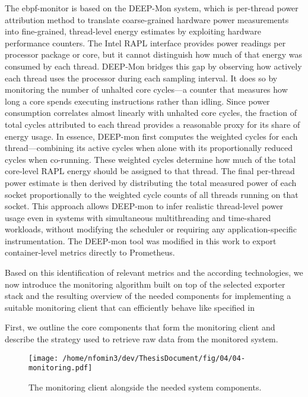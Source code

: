 The ebpf-monitor is based on the DEEP-Mon system, which is per-thread power attribution method to translate coarse-grained hardware power measurements into fine-grained, thread-level energy estimates by exploiting hardware performance counters. The Intel RAPL interface provides power readings per processor package or core, but it cannot distinguish how much of that energy was consumed by each thread. DEEP-Mon bridges this gap by observing how actively each thread uses the processor during each sampling interval. It does so by monitoring the number of unhalted core cycles—a counter that measures how long a core spends executing instructions rather than idling. Since power consumption correlates almost linearly with unhalted core cycles, the fraction of total cycles attributed to each thread provides a reasonable proxy for its share of energy usage.
In essence, DEEP-mon first computes the weighted cycles for each thread—combining its active cycles when alone with its proportionally reduced cycles when co-running. These weighted cycles determine how much of the total core-level RAPL energy should be assigned to that thread. The final per-thread power estimate is then derived by distributing the total measured power of each socket proportionally to the weighted cycle counts of all threads running on that socket. This approach allows DEEP-mon to infer realistic thread-level power usage even in systems with simultaneous multithreading and time-shared workloads, without modifying the scheduler or requiring any application-specific instrumentation. The DEEP-mon tool was modified in this work to export container-level metrics directly to Prometheus.

Based on this identification of relevant metrics and the according technologies, we now introduce the monitoring algorithm built on top of the selected exporter stack and the resulting overview of the needed components for implementing a suitable monitoring client that can efficiently behave like specified in %

First, we outline the core components that form the monitoring client and describe the strategy used to retrieve raw data from the monitored system.
\begin{figure}[htbp]
    \centering
    \texttt{[image: /home/nfomin3/dev/ThesisDocument/fig/04/04-monitoring.pdf]} %
    \caption{The monitoring client alongside the needed system components.}
    \label{fig:monitoring_client}
\end{figure}

